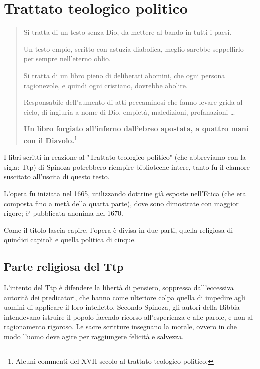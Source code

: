 \chapter{Trattato teologico politico}

\bigskip
\bigskip

\begin{quotation}
	\small Si tratta di un testo senza Dio, da mettere al bando in tutti i paesi.
	
	Un testo empio, scritto con astuzia diabolica, meglio sarebbe seppellirlo per sempre nell'eterno oblio.
	
	Si tratta di un libro pieno di deliberati abomini, che ogni persona ragionevole, e quindi ogni cristiano, dovrebbe abolire.
	
	Responsabile dell'aumento di atti peccaminosi che fanno levare grida al cielo, di ingiuria a nome di Dio, empietà, maledizioni, profanazioni \dots
	
	\textbf{Un libro forgiato all'inferno dall'ebreo apostata, a quattro mani con il Diavolo.}\footnote{Alcuni commenti del XVII secolo al trattato teologico politico.}
		
\end{quotation}

I libri scritti in reazione al "Trattato teologico politico" (che abbreviamo con la sigla: Ttp) di Spinoza potrebbero riempire biblioteche intere, tanto fu il clamore suscitato all'uscita di questo testo.

L'opera fu iniziata nel 1665, utilizzando dottrine già esposte nell'Etica (che era composta fino a metà della quarta parte), dove sono dimostrate con maggior rigore; è' pubblicata anonima nel 1670. 

Come il titolo lascia capire, l'opera è divisa in due parti, quella religiosa di quindici capitoli e quella politica di cinque.

\section[Parte religiosa]{Parte religiosa del Ttp}

L'intento del Ttp è difendere la libertà di pensiero, soppressa dall'eccessiva autorità dei predicatori, che hanno come ulteriore colpa quella di impedire agli uomini di applicare il loro intelletto. Secondo Spinoza, gli autori della Bibbia intendevano istruire il popolo facendo ricorso all'esperienza e alle parole, e non al ragionamento rigoroso. Le sacre scritture insegnano la morale, ovvero in che modo l'uomo deve agire per raggiungere felicità e salvezza. 

